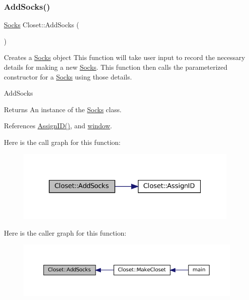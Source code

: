 \subsubsection{\texorpdfstring{Add\+Socks()}{AddSocks()}}
{\footnotesize\ttfamily \mbox{\hyperlink{classSocks}{Socks}} Closet\+::\+Add\+Socks (\begin{DoxyParamCaption}{ }\end{DoxyParamCaption})\hspace{0.3cm}{\ttfamily [private]}}



Creates a \textquotesingle{}\mbox{\hyperlink{classSocks}{Socks}}\textquotesingle{} object  This function will take user input to record the necessary details for making a new \textquotesingle{}\mbox{\hyperlink{classSocks}{Socks}}\textquotesingle{}. This function then calls the parameterized constructor for a \textquotesingle{}\mbox{\hyperlink{classSocks}{Socks}}\textquotesingle{} using those details. 

Add\+Socks \begin{DoxyReturn}{Returns}
An instance of the \textquotesingle{}\mbox{\hyperlink{classSocks}{Socks}}\textquotesingle{} class. 
\end{DoxyReturn}


References \mbox{\hyperlink{classCloset_afabc27d621abdf0089a6b3027ea8f470}{Assign\+I\+D()}}, and \mbox{\hyperlink{classCloset_af1eb4f786cc4eccd3018b90632236a93}{window}}.

Here is the call graph for this function\+:
\nopagebreak
\begin{figure}[H]
\begin{center}
\leavevmode
\includegraphics[width=313pt]{classCloset_aac44ecf78525b3e0ac4ed80af2133186_cgraph}
\end{center}
\end{figure}
Here is the caller graph for this function\+:
\nopagebreak
\begin{figure}[H]
\begin{center}
\leavevmode
\includegraphics[width=350pt]{classCloset_aac44ecf78525b3e0ac4ed80af2133186_icgraph}
\end{center}
\end{figure}
\mbox{\label{classCloset_afabc27d621abdf0089a6b3027ea8f470}} 
